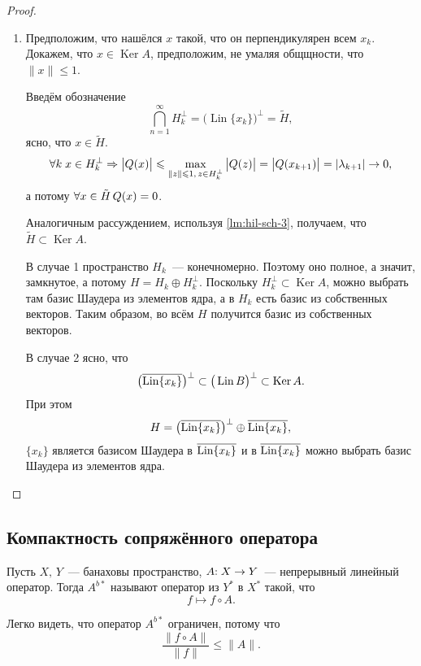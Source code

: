 \documentclass{notes}
\DeclareMathOperator{\Ker}{Ker}
\DeclareMathOperator{\Lin}{Lin}
\begin{document}
\begin{thm}
\begin{proof}
\begin{enumerate}
				\item Предположим, что нашёлся $x$ такой, что он перпендикулярен всем $x_k$. Докажем, что $x \in \Ker A$, предположим, не умаляя общщности, что $\|x\| \leqslant 1$.

				Введём обозначение
				\[
					\bigcap\limits_{n = 1}^{\infty} H_k^{\perp} = \big(\Lin \{x_k\}\big)^{\perp} = \tilde{H},
				\]
				ясно, что $x \in \tilde{H}$.
				\[
					\forall k \; x \in H_k^{\perp} \Rightarrow \big|Q(x)\big| \leqslant \max\limits_{\|z\| \leqslant 1, \, z \in H_k^{\perp}} \big|Q(z)\big| = \big|Q(x_{k + 1})\big| = |\lambda_{k + 1}| \to 0,
				\]
				а потому $\forall x \in \tilde{H} \, Q(x) = 0$.

				Аналогичным рассуждением, используя \ref{lm:hil-sch-3}, получаем, что $\tilde{H} \subset \Ker A$.

				В случае 1 пространство $H_k$~--- конечномерно. Поэтому оно полное, а значит, замкнутое, а потому $H = H_k \oplus H_k^{\perp}$. Поскольку $H_k^{\perp} \subset \Ker A$, можно выбрать там базис Шаудера из элементов ядра, а в $H_k$ есть базис из собственных векторов. Таким образом, во всём $H$ получится базис из собственных векторов.

				В случае 2 ясно, что
				\[
					\big(\ov{\Lin \{x_k\}}\big)^{\perp} \subset \big(\Lin B \big)^{\perp} \subset \Ker A.
				\]
				При этом 
				\[
					H = \big(\ov{\Lin \{x_k\}}\big)^{\perp} \oplus \ov{\Lin \{x_k\}},
				\]
				$\{x_k\}$ является базисом Шаудера в $\ov{\Lin \{x_k\}}$ и в $\ov{\Lin \{x_k\}}$ можно выбрать базис Шаудера из элементов ядра.
 			\end{enumerate}	
		\end{proof}
	\end{thm}

	\setcounter{subsection}{32}

\subsection{Компактность сопряжённого оператора}

	\begin{de}
		Пусть $X, \, Y$~--- банаховы пространство, $A\text{\text{:}} \; X \to Y$~--- непрерывный линейный оператор. Тогда  $A^{b*}$ называют оператор из $Y^*$ в $X^*$ такой, что
		\[
			f \mapsto f \circ A.
		\]
	\end{de}

	\begin{rem}
		Легко видеть, что оператор $A^{b*}$ ограничен, потому что
		\[
			\dfrac{\|f \circ A\|}{\|f\|} \leqslant \|A\|.
		\]
	\end{rem}
\end{document}
